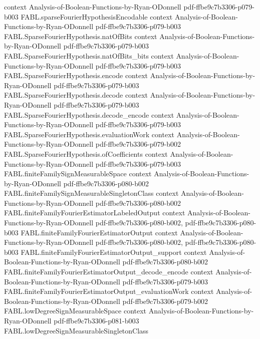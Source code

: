 \begin{theorem}
  {context}
  {Analysis-of-Boolean-Functions-by-Ryan-ODonnell}
  {pdf-ffbe9c7b3306-p079-b003}
\proofstep
  {FABL.sparseFourierHypothesisEncodable}
  {context}
  {Analysis-of-Boolean-Functions-by-Ryan-ODonnell}
  {pdf-ffbe9c7b3306-p079-b003}
\proofstep
  {FABL.SparseFourierHypothesis.natOfBits}
  {context}
  {Analysis-of-Boolean-Functions-by-Ryan-ODonnell}
  {pdf-ffbe9c7b3306-p079-b003}
\proofstep
  {FABL.SparseFourierHypothesis.natOfBits_bits}
  {context}
  {Analysis-of-Boolean-Functions-by-Ryan-ODonnell}
  {pdf-ffbe9c7b3306-p079-b003}
\proofstep
  {FABL.SparseFourierHypothesis.encode}
  {context}
  {Analysis-of-Boolean-Functions-by-Ryan-ODonnell}
  {pdf-ffbe9c7b3306-p079-b003}
\proofstep
  {FABL.SparseFourierHypothesis.decode}
  {context}
  {Analysis-of-Boolean-Functions-by-Ryan-ODonnell}
  {pdf-ffbe9c7b3306-p079-b003}
\proofstep
  {FABL.SparseFourierHypothesis.decode_encode}
  {context}
  {Analysis-of-Boolean-Functions-by-Ryan-ODonnell}
  {pdf-ffbe9c7b3306-p079-b003}
\proofstep
  {FABL.SparseFourierHypothesis.evaluationWork}
  {context}
  {Analysis-of-Boolean-Functions-by-Ryan-ODonnell}
  {pdf-ffbe9c7b3306-p079-b002}
\proofstep
  {FABL.SparseFourierHypothesis.ofCoefficients}
  {context}
  {Analysis-of-Boolean-Functions-by-Ryan-ODonnell}
  {pdf-ffbe9c7b3306-p079-b003}
\proofstep
  {FABL.finiteFamilySignMeasurableSpace}
  {context}
  {Analysis-of-Boolean-Functions-by-Ryan-ODonnell}
  {pdf-ffbe9c7b3306-p080-b002}
\proofstep
  {FABL.finiteFamilySignMeasurableSingletonClass}
  {context}
  {Analysis-of-Boolean-Functions-by-Ryan-ODonnell}
  {pdf-ffbe9c7b3306-p080-b002}
\proofstep
  {FABL.finiteFamilyFourierEstimatorLabeledOutput}
  {context}
  {Analysis-of-Boolean-Functions-by-Ryan-ODonnell}
  {pdf-ffbe9c7b3306-p080-b002,
    pdf-ffbe9c7b3306-p080-b003}
\proofstep
  {FABL.finiteFamilyFourierEstimatorOutput}
  {context}
  {Analysis-of-Boolean-Functions-by-Ryan-ODonnell}
  {pdf-ffbe9c7b3306-p080-b002,
    pdf-ffbe9c7b3306-p080-b003}
\proofstep
  {FABL.finiteFamilyFourierEstimatorOutput_support}
  {context}
  {Analysis-of-Boolean-Functions-by-Ryan-ODonnell}
  {pdf-ffbe9c7b3306-p080-b002}
\proofstep
  {FABL.finiteFamilyFourierEstimatorOutput_decode_encode}
  {context}
  {Analysis-of-Boolean-Functions-by-Ryan-ODonnell}
  {pdf-ffbe9c7b3306-p079-b003}
\proofstep
  {FABL.finiteFamilyFourierEstimatorOutput_evaluationWork}
  {context}
  {Analysis-of-Boolean-Functions-by-Ryan-ODonnell}
  {pdf-ffbe9c7b3306-p079-b002}
\proofstep
  {FABL.lowDegreeSignMeasurableSpace}
  {context}
  {Analysis-of-Boolean-Functions-by-Ryan-ODonnell}
  {pdf-ffbe9c7b3306-p081-b003}
\proofstep
  {FABL.lowDegreeSignMeasurableSingletonClass}

\end{theorem}
